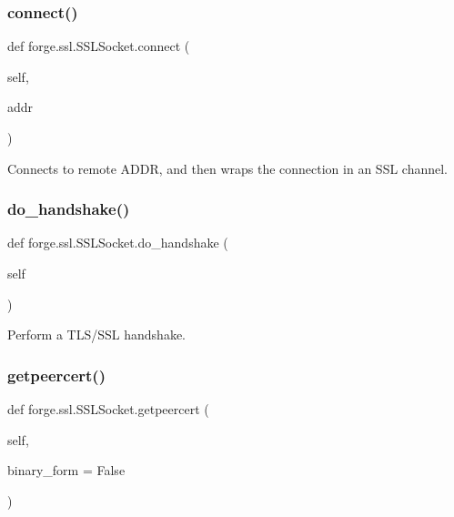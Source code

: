 \subsubsection{\texorpdfstring{connect()}{connect()}}
{\footnotesize\ttfamily def forge.\+ssl.\+S\+S\+L\+Socket.\+connect (\begin{DoxyParamCaption}\item[{}]{self,  }\item[{}]{addr }\end{DoxyParamCaption})}

\begin{DoxyVerb}Connects to remote ADDR, and then wraps the connection in
an SSL channel.\end{DoxyVerb}
 \mbox{\label{classforge_1_1ssl_1_1_s_s_l_socket_add93497ad9ad1614154f9eff518b2ef9}} 
\subsubsection{\texorpdfstring{do\+\_\+handshake()}{do\_handshake()}}
{\footnotesize\ttfamily def forge.\+ssl.\+S\+S\+L\+Socket.\+do\+\_\+handshake (\begin{DoxyParamCaption}\item[{}]{self }\end{DoxyParamCaption})}

\begin{DoxyVerb}Perform a TLS/SSL handshake.\end{DoxyVerb}
 \mbox{\label{classforge_1_1ssl_1_1_s_s_l_socket_a89c7514819f37d187aad23a85bc27948}} 
\subsubsection{\texorpdfstring{getpeercert()}{getpeercert()}}
{\footnotesize\ttfamily def forge.\+ssl.\+S\+S\+L\+Socket.\+getpeercert (\begin{DoxyParamCaption}\item[{}]{self,  }\item[{}]{binary\+\_\+form = {\ttfamily False} }\end{DoxyParamCaption})}

